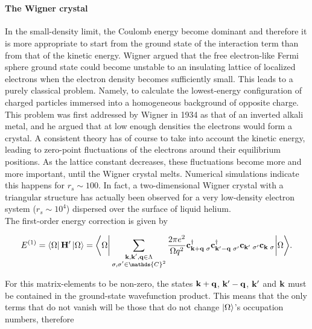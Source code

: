 \documentclass{homework}
\begin{document}
\blanky \\

\paragraph{\textbf{The Wigner crystal}}

In the small-density limit, the Coulomb energy become dominant and therefore it is more appropriate to start from the ground state of the interaction term than from that of the kinetic energy. Wigner argued that the free electron-like Fermi sphere ground state could become unstable to an insulating lattice of localized electrons when the electron density becomes sufficiently small. This leads to a purely classical problem. Namely, to calculate the lowest-energy configuration of charged particles immersed into a homogeneous background of opposite charge. This problem was first addressed by Wigner in 1934 as that of an inverted alkali metal, and he argued that at low enough densities the electrons would form a crystal. A consistent theory has of course to take into account the kinetic energy, leading to zero-point fluctuations of the electrons around their equilibrium positions. As the lattice constant decreases, these fluctuations become more and more important, until the Wigner crystal melts. Numerical simulations indicate this happens for $r_s \sim 100$. In fact, a two-dimensional Wigner crystal with a triangular structure has actually been observed for a very low-density electron system ($r_s\sim 10^4$) dispersed over the surface of liquid helium. \\

The first-order energy correction is given by 

$$
    E^{(1)} = \bra{\Omega} {{\bf H}}' \ket{\Omega} = \bigg \langle {\Omega} \bigg|  \sum_{\substack{{\bf k},{\bf k}',{\bf q} \in \Lambda\\
    \sigma, \sigma' \in \mathds{C}^2}} \frac{2\pi e^2}{\Omega q^2} {\bf c}_{{\bf k}+{\bf q} \blanky \sigma}^\dagger {\bf c}_{{\bf k}'-{\bf q} \blanky \sigma'}^\dagger {\bf c}_{{\bf k}' \blanky \sigma'} {\bf c}_{{\bf k} \blanky \sigma} \bigg| {\Omega} \bigg \rangle.
$$

For this matrix-elements to be non-zero, the states ${\bf k}+{\bf q}$, ${\bf k}'-{\bf q}$, ${\bf k}'$ and ${\bf k}$ must be contained in the ground-state wavefunction product. This means that the only terms that do not vanish will be those that do not change $\ket{\Omega}$'s occupation numbers, therefore
\end{document}
